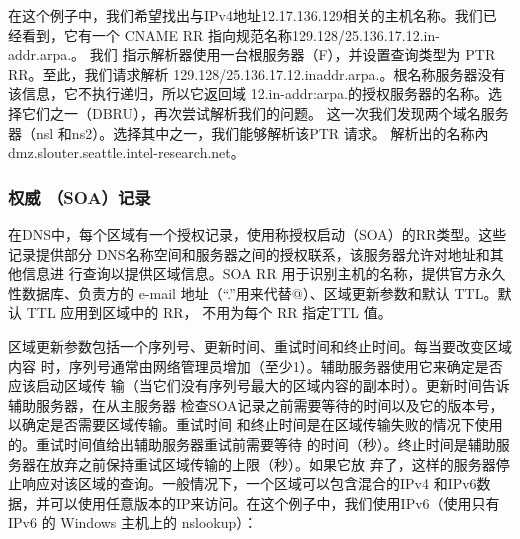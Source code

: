 在这个例子中，我们希望找出与IPv4地址12.17.136.129相关的主机名称。我们已
经看到，它有一个 CNAME RR 指向规范名称129.128/25.136.17.12.in-addr.arpa.。 我们
指示解析器使用一台根服务器（F），并设置查询类型为 PTR RR。至此，我们请求解析
129.128/25.136.17.12.inaddr.arpa.。根名称服务器没有该信息，它不执行递归，所以它返回域
12.in-addr:arpa.的授权服务器的名称。选择它们之一（DBRU），再次尝试解析我们的问题。
这一次我们发现两个域名服务器（nsl 和ns2）。选择其中之一，我们能够解析该PTR 请求。
解析出的名称內 dmz.slouter.seattle.intel-research.net。

\subsubsection{权威 （SOA）记录}

在DNS中，每个区域有一个授权记录，使用称授权启动（SOA）的RR类型。这些
记录提供部分 DNS名称空间和服务器之间的授权联系，该服务器允许对地址和其他信息进
行查询以提供区域信息。SOA RR 用于识别主机的名称，提供官方永久性数据库、负责方的
e-mail 地址（“.”用来代替@）、区域更新参数和默认 TTL。默认 TTL 应用到区域中的 RR，
不用为每个 RR 指定TTL 值。

区域更新参数包括一个序列号、更新时间、重试时间和终止时间。每当要改变区域内容
时，序列号通常由网络管理员增加（至少1）。辅助服务器使用它来确定是否应该启动区域传
输（当它们没有序列号最大的区域内容的副本时）。更新时间告诉辅助服务器，在从主服务器
检查SOA记录之前需要等待的时间以及它的版本号，以确定是否需要区域传输。重试时间
和终止时间是在区域传输失败的情况下使用的。重试时间值给出辅助服务器重试前需要等待
的时间（秒）。终止时间是辅助服务器在放弃之前保持重试区域传输的上限（秒）。如果它放
弃了，这样的服务器停止响应对该区域的查询。一般情况下，一个区域可以包含混合的IPv4
和IPv6数据，并可以使用任意版本的IP来访问。在这个例子中，我们使用IPv6（使用只有
IPv6 的 Windows 主机上的 nslookup）：

